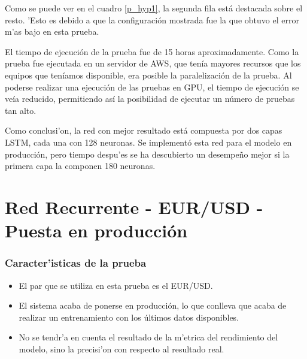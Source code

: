 Como se puede ver en el cuadro \ref{p_hyp1}, la segunda fila está destacada sobre el resto. 'Esto es debido a que la configuración mostrada fue la que obtuvo el error m'as bajo en esta prueba. 

El tiempo de ejecución de la prueba fue de 15 horas aproximadamente. Como la prueba fue ejecutada en un servidor de AWS, que tenía mayores recursos que los equipos que teníamos disponible, era posible la paralelización de la prueba. Al poderse realizar una ejecución de las pruebas en GPU, el tiempo de ejecución se veía reducido, permitiendo así la posibilidad de ejecutar un número de pruebas tan alto.   

Como conclusi'on, la red con mejor resultado está compuesta por dos capas LSTM, cada una con 128 neuronas. Se implementó esta red para el modelo en producción, pero tiempo despu'es se ha descubierto un desempeño mejor si la primera capa la componen 180 neuronas. 


\clearpage
























\section{Red Recurrente - EUR/USD - Puesta en producción}\label{sec:pruebarecbaja_1}


\subsubsection*{Caracter'isticas de la prueba}
\begin{itemize}
\item El par que se utiliza en esta prueba es el EUR/USD.
\item El sistema acaba de ponerse en producción, lo que conlleva que acaba de realizar un entrenamiento con los últimos datos disponibles.
\item No se tendr'a en cuenta el resultado de la m'etrica del rendimiento del modelo, sino la precisi'on con respecto al resultado real.
\end{itemize}

